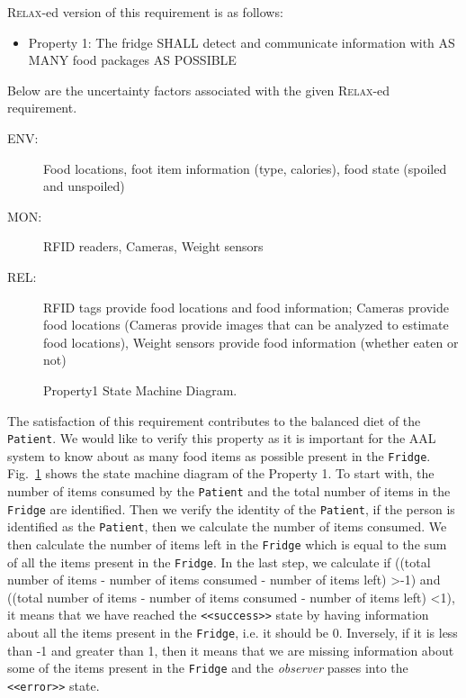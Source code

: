 \documentclass[a4paper,twoside]{article}
\def\myrelax{\textsc{Relax}}                  %
\begin{document}
\myrelax{}-ed version of this requirement is as follows:

\begin{itemize}
\item Property 1: The fridge SHALL detect and communicate information with AS MANY food packages AS POSSIBLE
\end{itemize}

Below are the uncertainty factors associated with the given \myrelax{}-ed requirement.

\begin{description}
\item[ENV:] Food locations, foot item information (type, calories), food state (spoiled and unspoiled)
\item[MON:] RFID readers, Cameras, Weight sensors
\item[REL:] RFID tags provide food locations and food information; Cameras provide food locations (Cameras provide images that can be analyzed to estimate food locations), Weight sensors provide food information (whether eaten or not)
\end{description}

\begin{figure}[!h]
  \centering
  {}
  \caption{Property1 State Machine Diagram.}
  \label{fig:property1stm}
 \end{figure}
 
The satisfaction of this requirement contributes to the balanced diet of the \texttt{Patient}. We would like to verify this property as it is important for the AAL system to know about as many food items as possible present in the \texttt{Fridge}. Fig.~\ref{fig:property1stm} shows the state machine diagram of the Property 1. To start with, the number of items consumed by the \texttt{Patient} and the total number of items in the \texttt{Fridge} are identified. Then we verify the identity of the \texttt{Patient}, if the person is identified as the \texttt{Patient}, then we calculate the number of items consumed. We then calculate the number of items left in the \texttt{Fridge} which is equal to the sum of all the items present in the \texttt{Fridge}. In the last step, we calculate if ((total number of items - number of items consumed - number of items left) \textgreater -1) and ((total number of items - number of items consumed - number of items left) \textless 1), it means that we have reached the \texttt{<<success>>} state by having information about all the items present in the \texttt{Fridge}, i.e. it should be 0. Inversely, if it is less than -1 and greater than 1, then it means that we are missing information about some of the items present in the \texttt{Fridge} and the \textit{observer} passes into the \texttt{<<error>>} state.
\end{document}
